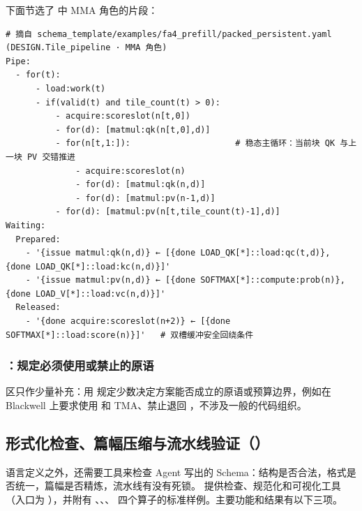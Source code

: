 下面节选了  中 MMA 角色的片段：
\begin{CodeBox}
\begin{Verbatim}[breaklines,breakanywhere,breaksymbolleft={},breaksymbolright={},breakautoindent=true]
# 摘自 schema_template/examples/fa4_prefill/packed_persistent.yaml (DESIGN.Tile_pipeline · MMA 角色)
Pipe:
  - for(t):
      - load:work(t)
      - if(valid(t) and tile_count(t) > 0):
          - acquire:scoreslot(n[t,0])
          - for(d): [matmul:qk(n[t,0],d)]
          - for(n[t,1:]):                     # 稳态主循环：当前块 QK 与上一块 PV 交错推进
              - acquire:scoreslot(n)
              - for(d): [matmul:qk(n,d)]
              - for(d): [matmul:pv(n-1,d)]
          - for(d): [matmul:pv(n[t,tile_count(t)-1],d)]
Waiting:
  Prepared:
    - '{issue matmul:qk(n,d)} ← [{done LOAD_QK[*]::load:qc(t,d)}, {done LOAD_QK[*]::load:kc(n,d)}]'
    - '{issue matmul:pv(n,d)} ← [{done SOFTMAX[*]::compute:prob(n)}, {done LOAD_V[*]::load:vc(n,d)}]'
  Released:
    - '{done acquire:scoreslot(n+2)} ← [{done SOFTMAX[*]::load:score(n)}]'   # 双槽缓冲安全回绕条件
\end{Verbatim}
\end{CodeBox}
\subsubsection{：规定必须使用或禁止的原语}\label{sec:schema-realization}
 区只作少量补充：用  规定少数决定方案能否成立的原语或预算边界，例如在 Blackwell 上要求使用  和 TMA、禁止退回 ，不涉及一般的代码组织。


\newpage

\subsection{形式化检查、篇幅压缩与流水线验证（）}\label{sec:schema-template}
语言定义之外，还需要工具来检查 Agent 写出的 Schema：结构是否合法，格式是否统一，篇幅是否精炼，流水线有没有死锁。 提供检查、规范化和可视化工具（入口为 ），并附有 、、、 四个算子的标准样例。主要功能和结果有以下三项。


